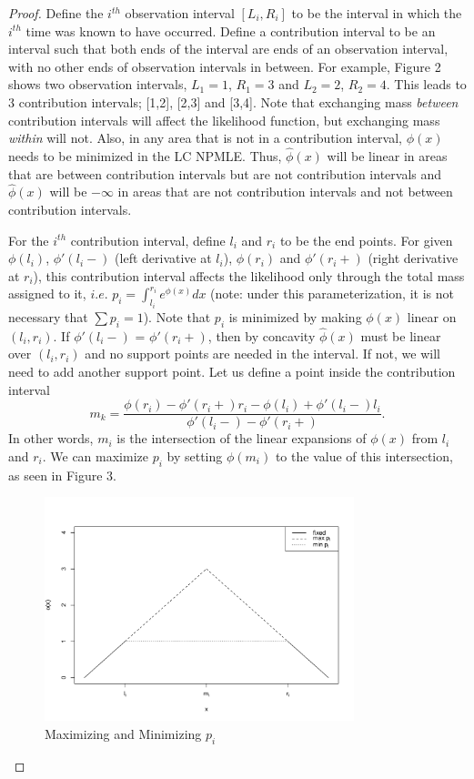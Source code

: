 \documentclass[12pt]{article}
\numberwithin{equation}{section}
\begin{document}
	\begin{proof}

	Define the $i^{th}$ observation interval $[L_i, R_i]$ to be the interval in which the $i^{th}$ time was known to have occurred. Define a contribution interval to be an interval such that both ends of the interval are ends of an observation interval, with no other ends of observation intervals in between. For example, Figure 2 shows two observation intervals, $L_1 = 1$, $R_1 = 3$ and $L_2 = 2$, $R_2 = 4$. This leads to 3 contribution intervals; [1,2], [2,3] and [3,4]. Note that exchanging mass \emph{between} contribution intervals will affect the likelihood function, but exchanging mass \emph{within} will not. Also, in any area that is not in a contribution interval, $\phi(x)$ needs to be minimized in the LC NPMLE. Thus, $\hat \phi(x)$ will be linear in areas that are between contribution intervals but are not contribution intervals and $\hat \phi(x)$ will be $-\infty$ in areas that are not contribution intervals and not between contribution intervals. 

	For the $i^{th}$ contribution interval, define $l_i$ and $r_i$ to be the end points. For given $\phi(l_i)$, $\phi'(l_i -)$ (left derivative at $l_i$), $\phi(r_i)$ and $\phi'(r_i+)$ (right derivative at $r_i$), this contribution interval affects the likelihood only through the total mass assigned to it, $i.e.$ $p_i = \int_{l_i}^{r_i} e^ {\phi(x)} dx$ (note: under this parameterization, it is not necessary that $\sum p_i = 1$). Note that $p_i$ is minimized by making $\phi(x)$ linear on $(l_i, r_i)$. If $\phi'(l_i - )$ = $\phi'(r_i + )$, then by concavity $\hat{\phi}(x)$ must be linear over $(l_i, r_i)$ and no support points are needed in the interval. If not, we will need to add another support point. Let us define a point inside the contribution interval 	
	\[ m_k = \frac{\phi(r_i) - \phi'(r_i + ) r_i - \phi(l_i) + \phi'(l_i - ) l_i} { \phi'(l_i - ) - \phi'(r_i + )}.
	\]		
	In other words, $m_i$ is the intersection of the linear expansions of $\phi(x)$ from $l_i$ and $r_i$. We can maximize $p_i$ by setting $\phi(m_i)$ to the value of this intersection, as seen in Figure 3. 

	\begin{figure}[h]
\centerline{\includegraphics[width = 9cm]{maxminpk.pdf}}
\caption{Maximizing and Minimizing $p_i$}
\end{figure}		


\end{proof}
\end{document}
